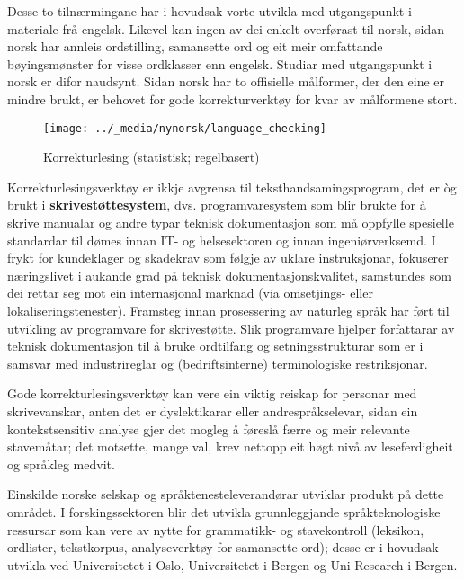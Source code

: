 \begin{multicols}{2}
Desse to tilnærmingane har i hovudsak vorte utvikla med utgangspunkt i materiale frå engelsk. Likevel kan ingen av dei enkelt overførast til norsk, sidan norsk har annleis ordstilling, samansette ord og eit meir omfattande bøyingsmønster for visse ordklasser enn engelsk. Studiar med utgangspunkt i norsk er difor naudsynt. Sidan norsk har to offisielle målformer, der den eine er mindre brukt, er behovet for gode korrekturverktøy for kvar av målformene stort. 

\begin{figure*}[htb]
  \center
  \texttt{[image: ../\_media/nynorsk/language\_checking]}
  \caption{Korrekturlesing (statistisk; regelbasert)}
  \label{fig:langcheckingaarch_no}
\end{figure*}

Korrekturlesingsverktøy er ikkje avgrensa til teksthandsamingsprogram, det er òg brukt i \textbf{skrivestøttesystem}, dvs. programvaresystem som blir brukte for å skrive manualar og andre typar teknisk dokumentasjon som må oppfylle spesielle standardar til dømes innan IT- og helsesektoren og innan ingeniørverksemd. I frykt for kundeklager og skadekrav som følgje av uklare instruksjonar, fokuserer næringslivet i aukande grad på teknisk dokumentasjonskvalitet, samstundes som dei rettar seg mot ein internasjonal marknad (via omsetjings- eller lokaliseringstenester). Framsteg innan prosessering av naturleg språk har ført til utvikling av programvare for skrivestøtte. Slik programvare hjelper forfattarar av teknisk dokumentasjon til å bruke ordtilfang og setningsstrukturar som er i samsvar med industrireglar og (bedriftsinterne) terminologiske restriksjonar. 


Gode korrekturlesingsverktøy kan vere ein viktig reiskap for personar med skrivevanskar, anten det er dyslektikarar eller andrespråkselevar, sidan ein kontekstsensitiv analyse gjer det mogleg å føreslå færre og meir relevante stavemåtar; det motsette, mange val, krev nettopp eit høgt nivå av leseferdigheit og språkleg medvit.

Einskilde norske selskap og språktenesteleverandørar utviklar produkt på dette området. 
I forskingssektoren blir det utvikla grunnleggjande språkteknologiske ressursar som kan vere av nytte for grammatikk- og stavekontroll (leksikon, ordlister, tekstkorpus, analyseverktøy for samansette ord); desse er i hovudsak utvikla ved Universitetet i Oslo, Universitetet i Bergen og Uni Research i Bergen. 


\end{multicols}
